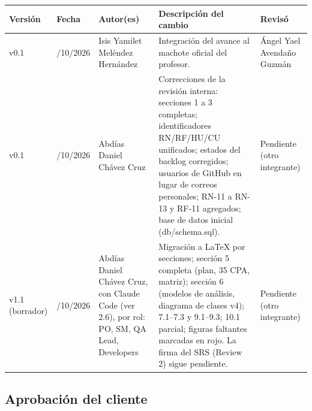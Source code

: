 {\def\LTcaptype{none} %
\begin{longtable}[]{@{}
  >{\raggedright\arraybackslash}p{}
  >{\raggedright\arraybackslash}p{}
  >{\raggedright\arraybackslash}p{}
  >{\raggedright\arraybackslash}p{}
  >{\raggedright\arraybackslash}p{}@{}}
\toprule\noalign{}
\begin{minipage}[b]{\linewidth}\raggedright
\textbf{Versión}
\end{minipage} & \begin{minipage}[b]{\linewidth}\raggedright
\textbf{Fecha}
\end{minipage} & \begin{minipage}[b]{\linewidth}\raggedright
\textbf{Autor(es)}
\end{minipage} & \begin{minipage}[b]{\linewidth}\raggedright
\textbf{Descripción del cambio}
\end{minipage} & \begin{minipage}[b]{\linewidth}\raggedright
\textbf{Revisó}
\end{minipage} \\
\midrule\noalign{}
\endhead
\bottomrule\noalign{}
\endlastfoot
v0.1 & 22/10/2026 & Isis Yamilet Meléndez Hernández & Integración del
avance al machote oficial del profesor. & Ángel Yael Avendaño Guzmán \\
v0.1 & 29/10/2026 & Abdías Daniel Chávez Cruz & Correcciones de la
revisión interna: secciones 1 a 3 completas; identificadores RN/RF/HU/CU
unificados; estados del backlog corregidos; usuarios de GitHub en lugar
de correos personales; RN-11 a RN-13 y RF-11 agregados; base de datos
inicial (db/schema.sql). & Pendiente (otro integrante) \\
v1.1 (borrador) & 29/10/2026 & Abdías Daniel Chávez Cruz, con Claude Code
(ver 2.6), por rol: PO, SM, QA Lead, Developers & Migración a LaTeX por
secciones; sección 5 completa (plan, 35 CPA, matriz); sección 6 (modelos
de análisis, diagrama de clases v4); 7.1--7.3 y 9.1--9.3; 10.1 parcial;
figuras faltantes marcadas en rojo. La firma del SRS (Review 2) sigue
pendiente. & Pendiente (otro integrante) \\
\end{longtable}
}

\subsection{Aprobación del cliente}\label{aprobaciuxf3n-del-cliente}

